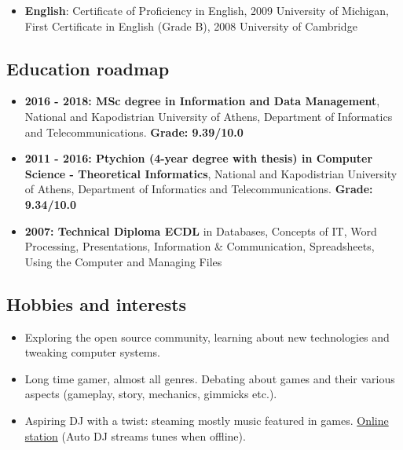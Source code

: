 \documentclass[a4paper,oneside,10pt]{article}
\begin{document}
	\begin{itemize}

		\item \textbf{English}: Certificate of Proficiency in English, 2009 University of Michigan, First Certificate in English (Grade B), 2008 University of Cambridge

	\end{itemize}	

\subsection*{Education roadmap}

	\begin{itemize}

		\item \textbf{2016 - 2018: MSc degree in Information and Data Management}, National and Kapodistrian University of Athens, Department of Informatics and Telecommunications. \textbf{Grade: 9.39/10.0}

		\item \textbf{2011 - 2016: Ptychion (4-year degree with thesis) in Computer Science - Theoretical Informatics}, National and Kapodistrian University of Athens, Department of Informatics and Telecommunications. \textbf{Grade: 9.34/10.0}

		\item \textbf{2007: Technical Diploma ECDL} in Databases, Concepts of IT, Word Processing, Presentations, Information \& Communication, Spreadsheets, Using the Computer and Managing Files

	\end{itemize}

\subsection*{Hobbies and interests}

	\begin{itemize}

		\item Exploring the open source community, learning about new technologies and tweaking computer systems.

		\item Long time gamer, almost all genres. Debating about games and their various aspects (gameplay, story, mechanics, gimmicks etc.). 
		
		\item Aspiring DJ with a twist: steaming mostly music featured in games. \href{https://zeno.fm/the-hermit}{Online station} (Auto DJ streams tunes when offline).

	\end{itemize}
\end{document}
